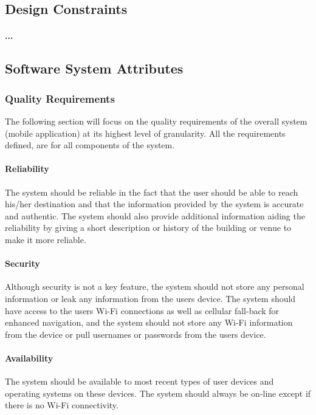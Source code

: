 \documentclass[runningheads,a4paper]{llncs}
\begin{document}
\subsection{Design Constraints}
\paragraph{...}

 \subsection{Software System Attributes}
\subsubsection{Quality Requirements \\}
The following section will focus on the quality requirements of the overall system (mobile application) at its highest level of granularity. All the requirements defined, are for all components of the system.

\paragraph{Reliability \\}
The system should be reliable in the fact that the user should be able to reach his/her destination and that the information provided by the system is accurate and authentic. The system should also provide additional information aiding the reliability by giving a short description or history of the building or venue to make it more reliable. 

\paragraph{Security \\}
Although security is not a key feature, the system should not store any personal information or leak any information from the users device. The system should have access to the users Wi-Fi connections as well as cellular fall-back for enhanced navigation, and the system should not store any Wi-Fi information from the device or pull usernames or passwords from the users device. 

\paragraph{Availability \\}
The system should be available to most recent types of user devices and operating systems on these devices. The system should always be on-line except if there is no Wi-Fi connectivity.
\end{document}
